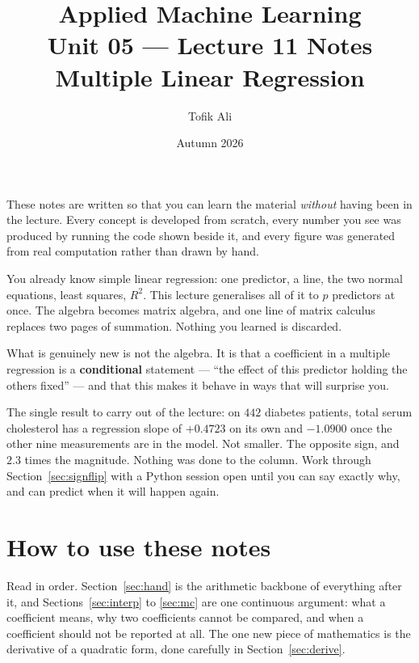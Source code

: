 \documentclass[11pt]{article}
\title{Applied Machine Learning\\Unit 05 --- Lecture 11 Notes\\
       Multiple Linear Regression}
\author{Tofik Ali}
\date{Autumn 2026}
\begin{document}
\maketitle

\begin{keyidea}
These notes are written so that you can learn the material \emph{without}
having been in the lecture. Every concept is developed from scratch, every
number you see was produced by running the code shown beside it, and every
figure was generated from real computation rather than drawn by hand.

You already know simple linear regression: one predictor, a line, the two
normal equations, least squares, $R^2$. This lecture generalises all of it to
$p$ predictors at once. The algebra becomes matrix algebra, and one line of
matrix calculus replaces two pages of summation. Nothing you learned is
discarded.

What is genuinely new is not the algebra. It is that a coefficient in a
multiple regression is a \textbf{conditional} statement --- ``the effect of
this predictor holding the others fixed'' --- and that this makes it behave in
ways that will surprise you.

The single result to carry out of the lecture: on $442$ diabetes patients,
total serum cholesterol has a regression slope of $\mathbf{+0.4723}$ on its
own and $\mathbf{-1.0900}$ once the other nine measurements are in the model.
Not smaller. The opposite sign, and $2.3$ times the magnitude. Nothing was
done to the column. Work through Section~\ref{sec:signflip} with a Python
session open until you can say exactly why, and can predict when it will
happen again.
\end{keyidea}

\tableofcontents
\medskip

\section{How to use these notes}
\label{sec:how}

Read in order. Section~\ref{sec:hand} is the arithmetic backbone of everything
after it, and Sections~\ref{sec:interp} to \ref{sec:mc} are one continuous
argument: what a coefficient means, why two coefficients cannot be compared,
and when a coefficient should not be reported at all. The one new piece of
mathematics is the derivative of a quadratic form, done carefully in
Section~\ref{sec:derive}.
\end{document}
